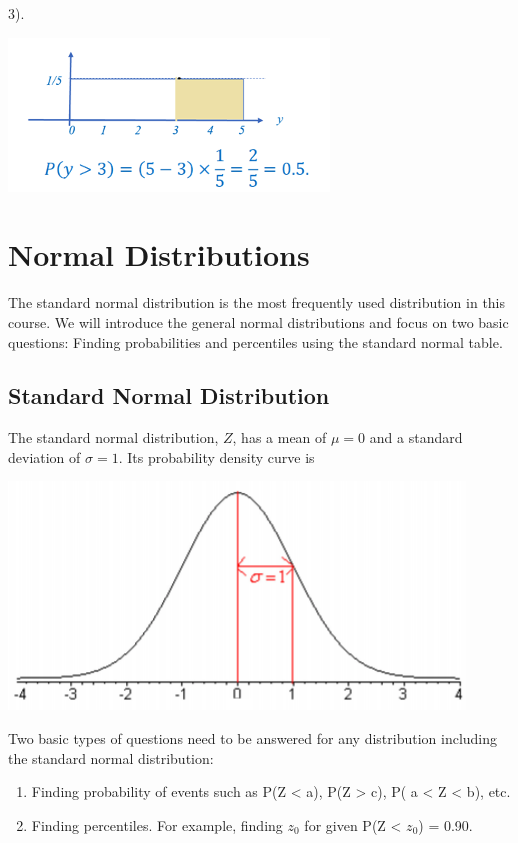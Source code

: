 \documentclass[
]{book}
\begin{document}
3).

\begin{center}\includegraphics[width=0.5\linewidth]{week03/uniformExample02-3} \end{center}

\hypertarget{normal-distributions}{%
\chapter{Normal Distributions}\label{normal-distributions}}

The standard normal distribution is the most frequently used distribution in this course. We will introduce the general normal distributions and focus on two basic questions: Finding probabilities and percentiles using the standard normal table.

\hfill\break

\hypertarget{standard-normal-distribution}{%
\section{Standard Normal Distribution}\label{standard-normal-distribution}}

The standard normal distribution, \(Z\), has a mean of \(\mu = 0\) and a standard deviation of \(\sigma = 1\). Its probability density curve is

\begin{center}\includegraphics[width=0.6\linewidth]{week04/z-Dist} \end{center}

Two basic types of questions need to be answered for any distribution including the standard normal distribution:

\begin{enumerate}
\def\labelenumi{\arabic{enumi}.}
\item
  Finding probability of events such as P(Z \textless{} a), P(Z \textgreater{} c), P( a \textless{} Z \textless{} b), etc.
\item
  Finding percentiles. For example, finding \(z_0\) for given P(Z \textless{} \(z_0\)) = 0.90.
\end{enumerate}
\end{document}

